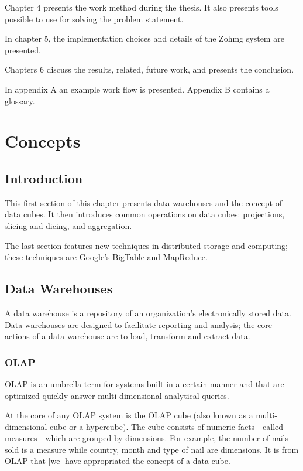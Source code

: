 Chapter 4 presents the work method during the thesis. It also presents tools
possible to use for solving the problem statement.

In chapter 5, the implementation choices and details of the Zohmg system are
presented.

Chapters 6 discuss the results, related, future work, and presents the
conclusion.

In appendix A an example work flow is presented. Appendix B contains a glossary.


\chapter{Concepts}



\section*{Introduction}

This first section of this chapter presents data warehouses and the concept of
data cubes. It then introduces common operations on data cubes: projections,
slicing and dicing, and aggregation.

The last section features new techniques in distributed storage and computing;
these techniques are Google's BigTable and MapReduce.


\section{Data Warehouses}

A data warehouse is a repository of an organization's electronically stored
data. Data warehouses are designed to facilitate reporting and analysis; the
core actions of a data warehouse are to load, transform and extract data.


\subsection*{OLAP}

OLAP is an umbrella term for systems built in a certain manner and that are
optimized quickly answer multi-dimensional analytical queries.

At the core of any OLAP system is the OLAP cube (also known as a
multi-dimensional cube or a hypercube). The cube consists of numeric
facts---called measures---which are grouped by dimensions. For example, the
number of nails sold is a measure while country, month and type of nail are
dimensions. It is from OLAP that [we] have appropriated the concept of a data
cube.


